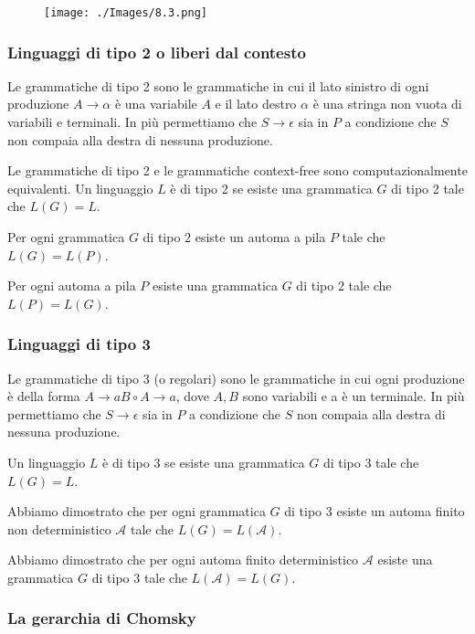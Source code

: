 \begin{figure}[hbpt!]
    \centering
    \texttt{[image: ./Images/8.3.png]}
\end{figure}
\FloatBarrier

\subsubsection{Linguaggi di tipo 2 o liberi dal contesto}

Le grammatiche di tipo 2 sono le grammatiche in cui il lato
sinistro di ogni produzione $A \rightarrow \alpha$ è una variabile $A$ e il lato
destro $\alpha$ è una stringa non vuota di variabili e terminali. In
più permettiamo che $S \rightarrow \epsilon$ sia in $P$ a condizione che $S$ non
compaia alla destra di nessuna produzione.

Le grammatiche di tipo 2 e le grammatiche context-free sono
computazionalmente equivalenti.
Un linguaggio $L$ è di tipo 2 se esiste una grammatica $G$ di
tipo 2 tale che $L(G)=L$.

Per ogni grammatica $G$ di tipo 2 esiste un automa a pila $P$
tale che $L(G)=L(P)$.

Per ogni automa a pila $P$ esiste una grammatica $G$ di tipo 2
tale che $L(P)=L(G)$.

\subsubsection{Linguaggi di tipo 3}

Le grammatiche di tipo 3 (o regolari) sono le grammatiche in cui ogni produzione è della forma $A \rightarrow a B \circ A \rightarrow a$, dove $A, B$ sono variabili e a è un terminale. In più permettiamo che $S \rightarrow \epsilon$ sia in $P$ a condizione che $S$ non compaia alla destra di nessuna produzione.

Un linguaggio $L$ è di tipo 3 se esiste una grammatica $G$ di tipo 3 tale che $L(G)=L$.

Abbiamo dimostrato che per ogni grammatica $G$ di tipo 3 esiste un automa finito non deterministico $\mathcal{A}$ tale che $L(G)=L(\mathcal{A})$.

Abbiamo dimostrato che per ogni automa finito deterministico $\mathcal{A}$ esiste una grammatica $G$ di tipo 3 tale che $L(\mathcal{A})=L(G)$.

\subsubsection{La gerarchia di Chomsky}

